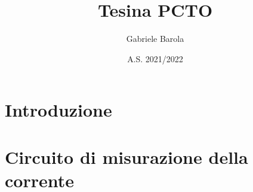\documentclass{article}
\title{Tesina PCTO}
\author{Gabriele Barola}
\date{A.S. 2021/2022}
\begin{document}
\maketitle

\section{Introduzione}




\section{Circuito di misurazione della corrente}

\end{document}
